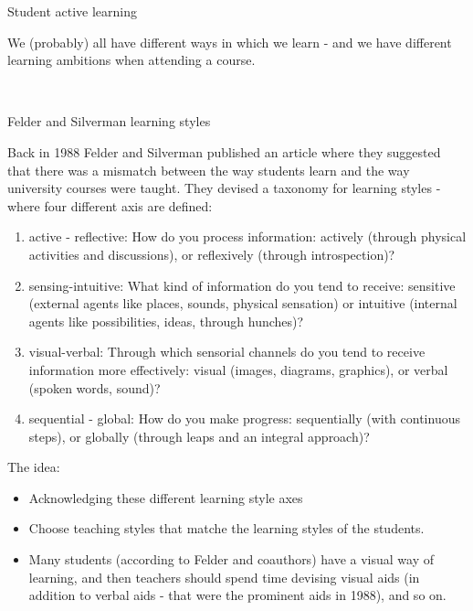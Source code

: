 \documentclass[ignorenonframetext,]{beamer}
\providecommand{\tightlist}{%
  \setlength{\itemsep}{0pt}\setlength{\parskip}{0pt}}
\begin{document}
\begin{frame}{Student active learning}

We (probably) all have different ways in which we learn - and we have
different learning ambitions when attending a course.

~

\begin{block}{Felder and Silverman learning styles}

Back in 1988 Felder and Silverman published an article where they
suggested that there was a mismatch between the way students learn and
the way university courses were taught. They devised a taxonomy for
learning styles - where four different axis are defined:

\end{block}

\end{frame}

\begin{frame}

\begin{enumerate}
\def\labelenumi{\arabic{enumi})}
\tightlist
\item
  active - reflective: How do you process information: actively (through
  physical activities and discussions), or reflexively (through
  introspection)?
\item
  sensing-intuitive: What kind of information do you tend to receive:
  sensitive (external agents like places, sounds, physical sensation) or
  intuitive (internal agents like possibilities, ideas, through
  hunches)?
\item
  visual-verbal: Through which sensorial channels do you tend to receive
  information more effectively: visual (images, diagrams, graphics), or
  verbal (spoken words, sound)?
\item
  sequential - global: How do you make progress: sequentially (with
  continuous steps), or globally (through leaps and an integral
  approach)?
\end{enumerate}

\end{frame}

\begin{frame}

\begin{block}{The idea:}

\begin{itemize}
\item
  Acknowledging these different learning style axes
\item
  Choose teaching styles that matche the learning styles of the
  students.
\item
  Many students (according to Felder and coauthors) have a visual way of
  learning, and then teachers should spend time devising visual aids (in
  addition to verbal aids - that were the prominent aids in 1988), and
  so on.
\end{itemize}

\end{block}

\end{frame}
\end{document}
